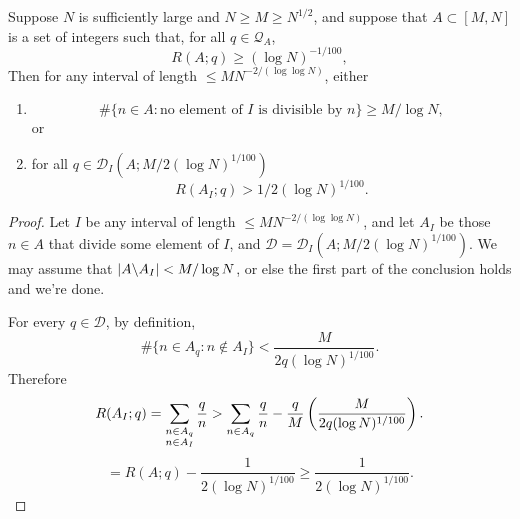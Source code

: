 \begin{lemma}\label{lem:good_d}
Suppose $N$ is sufficiently large and $N\geq M\geq N^{1/2}$, and suppose that $A\subset [M,N]$ is a set of integers such that, for all $q\in \mathcal{Q}_A$,
\[R(A;q) \geq (\log N)^{-1/100},\]
Then for any interval of length $\leq MN^{-2/(\log \log N)}$, either
\begin{enumerate}
\item \[\# \{ n\in A : \textrm{no element of }I\textrm{ is divisible by }n\}\geq M/\log N,\]
or
\item for all $q\in\mathcal{D}_I(A;M/2(\log N)^{1/100})$ 
\[R(A_I;q)> 1/2(\log N)^{1/100}.\]
\end{enumerate}
\end{lemma}
\begin{proof}
Let $I$ be any interval of length $\leq MN^{-2/(\log\log N)}$, and let $A_I$ be those $n\in A$ that divide some element of $I$, and $\mathcal{D}=\mathcal{D}_I(A;M/2(\log N)^{1/100})$. We may assume that $\left\lvert A\backslash A_I\right\rvert< M/\log N$, or else the first part of the conclusion holds and we're done.

For every $q\in \mathcal{D}$, by definition,
\[\#\{ n\in A_q : n\not\in A_I\} < \frac{M}{2q(\log N)^{1/100}}.\]
Therefore
\[R(A_I;q) = \sum_{\substack{n \in A_q\\n\in A_I}}\frac{q}{n}> \sum_{n \in A_q}\frac{q}{n}-\frac{q}{M}\left( \frac{M}{2q(\log N)^{1/100}}\right).\]
  \[=R(A;q) - \frac{1}{2(\log N)^{1/100}}\geq \frac{1}{2(\log N)^{1/100}}.\]
\end{proof}



